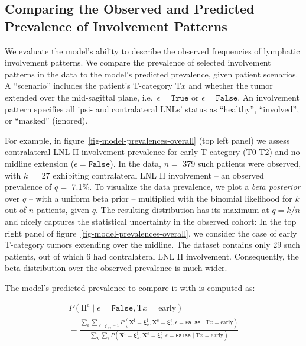 \documentclass[
  sn-mathphys-num,
]{sn-jnl}
\begin{document}
\subsection{Comparing the Observed and Predicted Prevalence of
Involvement Patterns}\label{sec-prevalence}

We evaluate the model's ability to describe the observed frequencies of
lymphatic involvement patterns. We compare the prevalence of selected
involvement patterns in the data to the model's predicted prevalence,
given patient scenarios. A ``scenario'' includes the patient's
T-category \(\text{T}x\) and whether the tumor extended over the
mid-sagittal plane, i.e.~\(\epsilon=\texttt{True}\) or
\(\epsilon=\texttt{False}\). An involvement pattern specifies all ipsi-
and contralateral LNLs' status as ``healthy'', ``involved'', or
``masked'' (ignored).

For example, in figure~\ref{fig-model-prevalences-overall} (top left
panel) we assess contralateral LNL II involvement prevalence for early
T-category (T0-T2) and no midline extension
(\(\epsilon=\texttt{False}\)). In the data, \(n=\) 379 such patients
were observed, with \(k=\) 27 exhibiting contralateral LNL II
involvement -- an observed prevalence of \(q=\) 7.1\%. To visualize the
data prevalence, we plot a \emph{beta posterior} over \(q\) -- with a
uniform beta prior -- multiplied with the binomial likelihood for \(k\)
out of \(n\) patients, given \(q\). The resulting distribution has its
maximum at \(q=k / n\) and nicely captures the statistical uncertainty
in the observed cohort: In the top right panel of
figure~\ref{fig-model-prevalences-overall}, we consider the case of
early T-category tumors extending over the midline. The dataset contains
only 29 such patients, out of which 6 had contralateral LNL II
involvement. Consequently, the beta distribution over the observed
prevalence is much wider.

The model's predicted prevalence to compare it with is computed as:

\[
\begin{multlined}
P \left( \text{II}^\text{c} \mid \epsilon=\texttt{False}, \text{T}x=\text{early} \right) \\ = \frac{ \sum_k \sum_{\ell \, : \, \xi_{\ell 2}=1}  P \left( \mathbf{X}^\text{i}=\boldsymbol{\xi}_k^\text{i}, \mathbf{X}^\text{c}=\boldsymbol{\xi}_\ell^\text{c}, \epsilon=\texttt{False} \mid \text{T}x=\text{early} \right)}{ \sum_k \sum_\ell P \left(\mathbf{X}^\text{i}=\boldsymbol{\xi}_k^\text{i}, \mathbf{X}^\text{c}=\boldsymbol{\xi}_\ell^\text{c}, \epsilon=\texttt{False} \mid \text{T}x=\text{early} \right)}
\end{multlined}
\]
\end{document}
